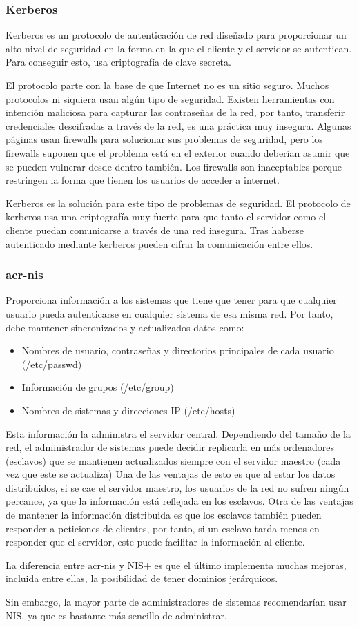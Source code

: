 \documentclass[titlepage, 12pt, a4paper]{article}
\begin{document}
\subsubsection{Kerberos}
Kerberos es un protocolo de autenticación de red diseñado para proporcionar un alto nivel de seguridad en la forma en la que el cliente y el servidor se autentican. Para conseguir esto, usa criptografía de clave secreta.\cite{mit-kerberos}\par El protocolo parte con la base de que Internet no es un sitio seguro. Muchos protocolos ni siquiera usan algún tipo de seguridad. Existen herramientas con intención maliciosa para capturar las contraseñas de la red, por tanto, transferir credenciales descifradas a través de la red, es una práctica muy insegura. Algunas páginas usan \gls{firewalls} para solucionar sus problemas de seguridad, pero los \gls{firewalls} suponen que el problema está en el exterior cuando deberían asumir que se pueden vulnerar desde dentro también. Los \gls{firewalls} son inaceptables porque restringen la forma que tienen los usuarios de acceder a internet.\par Kerberos es la solución para este tipo de problemas de seguridad. El protocolo de \gls{kerberos} usa una criptografía muy fuerte para que tanto el servidor como el cliente puedan comunicarse a través de una red insegura. Tras haberse autenticado mediante \gls{kerberos} pueden cifrar la comunicación entre ellos.
\subsubsection{\gls{acr-nis}}
Proporciona información a los sistemas que tiene que tener para que cualquier usuario pueda autenticarse en cualquier sistema de esa misma red. Por tanto, debe mantener sincronizados y actualizados datos como:
\begin{itemize}
	\item Nombres de usuario, contraseñas y directorios principales de cada usuario (/etc/passwd)
	\item Información de grupos (/etc/group)
	\item Nombres de sistemas y direcciones IP (/etc/hosts)
\end{itemize}
Esta información la administra el servidor central. Dependiendo del tamaño de la red, el administrador de sistemas puede decidir replicarla en más ordenadores (esclavos) que se mantienen actualizados siempre con el servidor maestro (cada vez que este se actualiza) Una de las ventajas de esto es que al estar los datos distribuidos, si se cae el servidor maestro, los usuarios de la red no sufren ningún percance, ya que la información está reflejada en los esclavos. Otra de las ventajas de mantener la información distribuida es que los esclavos también pueden responder a peticiones de clientes, por tanto, si un esclavo tarda menos en responder que el servidor, este puede facilitar la información al cliente.\par La diferencia entre \gls{acr-nis} y NIS+ es que el último implementa muchas mejoras, incluida entre ellas, la posibilidad de tener dominios jerárquicos.\par Sin embargo, la mayor parte de administradores de sistemas recomendarían usar NIS, ya que es bastante más sencillo de administrar.
\end{document}
